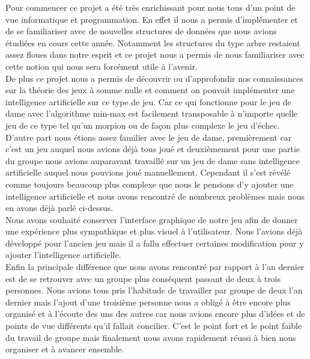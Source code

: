 \documentclass[12,french]{report}
\begin{document}
Pour commencer ce projet a été très enrichissant pour nous tous d'un point de vue informatique et programmation. En effet il nous a permis d'implémenter et de se familiariser avec de nouvelles structures de données que nous avions étudiées en cours cette année. Notamment les structures du type arbre restaient assez floues dans notre esprit et ce projet nous a permis de nous familiariser avec cette notion qui nous sera forcément utile à l'avenir.\\
De plus ce projet nous a permis de découvrir ou d'approfondir nos connaissances sur la théorie des jeux à somme nulle et comment on pouvait implémenter une intelligence artificielle sur ce type de jeu. Car ce qui fonctionne pour le jeu de dame avec l'algorithme min-max est facilement transposable à n'importe quelle jeu de ce type tel qu'un morpion ou de façon plus complexe le jeu d'échec.\\

D'autre part nous étions assez familier avec le jeu de dame, premièrement car c'est un jeu auquel nous avions déjà tous joué et deuxièmement pour une partie du groupe nous avions auparavant travaillé sur un jeu de dame sans intelligence artificielle auquel nous pouvions joué manuellement. Cependant il s'est révélé comme toujours beaucoup plus complexe que nous le pensions d'y ajouter une intelligence artificielle et nous avons rencontré de nombreux problèmes mais nous en avons déjà parlé ci-dessus.\\

Nous avons souhaité conserver l'interface graphique de notre jeu afin de donner une expérience plus sympathique et plus visuel à l'utilisateur. Nous l'avions déjà développé pour l'ancien jeu mais il a fallu effectuer certaines modification pour y ajouter l'intelligence artificielle.\\

Enfin la principale différence que nous avons rencontré par rapport à l'an dernier est de se retrouver avec un groupe plus conséquent passant de deux à trois personnes. Nous avions tous pris l'habitude de travailler par groupe de deux l'an dernier mais l'ajout d'une troisième personne nous a obligé à être encore plus organisé et à l'écoute des uns des autres car nous avions encore plus d'idées et de points de vue différents qu'il fallait concilier. C'est le point fort et le point faible du travail de groupe mais finalement nous avons rapidement réussi à bien nous organiser et à avancer ensemble.\\
\end{document}
